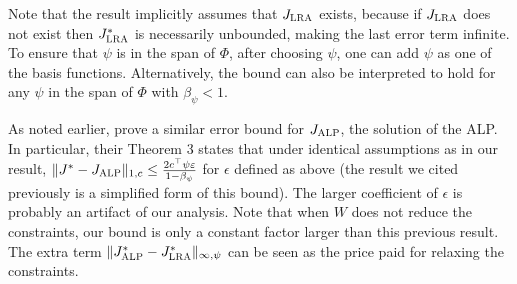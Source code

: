 Note that the result implicitly assumes that $J_{\text{\sc LRA}}$ exists, because if $J_{\text{\sc LRA}}$ does not exist then $J^*_{\text{\sc LRA}}$ is necessarily unbounded, making the last error term infinite. To ensure that $\psi$ is in the span of $\Phi$, after choosing $\psi$, one can add $\psi$ as one of the basis functions. Alternatively, the bound can also be interpreted to hold for any $\psi$ in the span of $\Phi$ with $\beta_\psi<1$.

As noted earlier, \citet{ALP} prove a similar error bound for $J_{\text{\sc ALP}}$, the solution of the ALP.
In particular, their Theorem 3 states that  under identical assumptions as in our result,
$\|J^* - J_{\text{\sc ALP}}\|_{1,c} \le \frac{2 c^\top \psi \varepsilon}{1-\beta_\psi}$ for $\epsilon$ defined as above
 (the result we cited previously is a simplified form of this bound).
The larger coefficient of $\epsilon$ is probably an artifact of our analysis. 
Note that when $W$ does not reduce the constraints, 
our bound is only a constant factor larger than this previous result.
The extra term $\|J^*_{\text{\sc ALP}}-J^*_{\text{\sc LRA}}\|_{\infty,\psi}$ can be seen as the price paid for relaxing the constraints.


